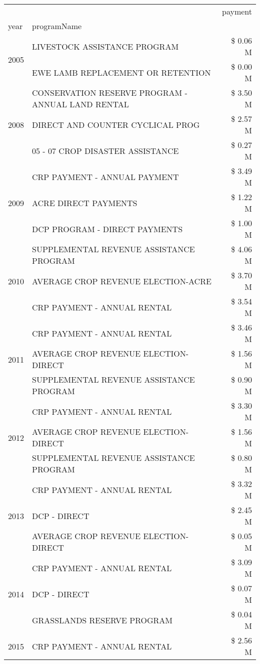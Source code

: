 \begin{tabular}{llr}
\toprule
 &  & payment \\
year & programName &  \\
\midrule
\multirow[t]{2}{*}{2005} & LIVESTOCK ASSISTANCE PROGRAM & \$ 0.06 M \\
 & EWE LAMB REPLACEMENT OR RETENTION & \$ 0.00 M \\
\cline{1-3}
\multirow[t]{3}{*}{2008} & CONSERVATION RESERVE PROGRAM - ANNUAL LAND RENTAL & \$ 3.50 M \\
 & DIRECT AND COUNTER CYCLICAL PROG & \$ 2.57 M \\
 & 05 - 07 CROP DISASTER ASSISTANCE & \$ 0.27 M \\
\cline{1-3}
\multirow[t]{3}{*}{2009} & CRP PAYMENT - ANNUAL PAYMENT & \$ 3.49 M \\
 & ACRE DIRECT PAYMENTS & \$ 1.22 M \\
 & DCP PROGRAM - DIRECT PAYMENTS & \$ 1.00 M \\
\cline{1-3}
\multirow[t]{3}{*}{2010} & SUPPLEMENTAL REVENUE ASSISTANCE PROGRAM & \$ 4.06 M \\
 & AVERAGE CROP REVENUE ELECTION-ACRE & \$ 3.70 M \\
 & CRP PAYMENT - ANNUAL RENTAL & \$ 3.54 M \\
\cline{1-3}
\multirow[t]{3}{*}{2011} & CRP PAYMENT - ANNUAL RENTAL & \$ 3.46 M \\
 & AVERAGE CROP REVENUE ELECTION-DIRECT & \$ 1.56 M \\
 & SUPPLEMENTAL REVENUE ASSISTANCE PROGRAM & \$ 0.90 M \\
\cline{1-3}
\multirow[t]{3}{*}{2012} & CRP PAYMENT - ANNUAL RENTAL & \$ 3.30 M \\
 & AVERAGE CROP REVENUE ELECTION-DIRECT & \$ 1.56 M \\
 & SUPPLEMENTAL REVENUE ASSISTANCE PROGRAM & \$ 0.80 M \\
\cline{1-3}
\multirow[t]{3}{*}{2013} & CRP PAYMENT - ANNUAL RENTAL & \$ 3.32 M \\
 & DCP - DIRECT & \$ 2.45 M \\
 & AVERAGE CROP REVENUE ELECTION-DIRECT & \$ 0.05 M \\
\cline{1-3}
\multirow[t]{3}{*}{2014} & CRP PAYMENT - ANNUAL RENTAL & \$ 3.09 M \\
 & DCP - DIRECT & \$ 0.07 M \\
 & GRASSLANDS RESERVE PROGRAM & \$ 0.04 M \\
\cline{1-3}
\multirow[t]{3}{*}{2015} & CRP PAYMENT - ANNUAL RENTAL & \$ 2.56 M \\

\end{tabular}
